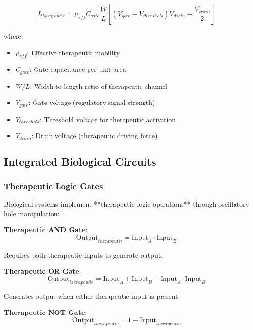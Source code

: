 \documentclass[12pt,a4paper]{article}
\begin{document}
\begin{equation}
I_{therapeutic} = \mu_{eff} C_{gate} \frac{W}{L} \left[(V_{gate} - V_{threshold})V_{drain} - \frac{V_{drain}^2}{2}\right]
\end{equation}

where:
\begin{itemize}
\item $\mu_{eff}$: Effective therapeutic mobility
\item $C_{gate}$: Gate capacitance per unit area
\item $W/L$: Width-to-length ratio of therapeutic channel
\item $V_{gate}$: Gate voltage (regulatory signal strength)
\item $V_{threshold}$: Threshold voltage for therapeutic activation
\item $V_{drain}$: Drain voltage (therapeutic driving force)
\end{itemize}

\subsection{Integrated Biological Circuits}

\subsubsection{Therapeutic Logic Gates}

Biological systems implement **therapeutic logic operations** through oscillatory hole manipulation:

\textbf{Therapeutic AND Gate}:
\begin{equation}
\text{Output}_{therapeutic} = \text{Input}_A \cdot \text{Input}_B
\end{equation}

Requires both therapeutic inputs to generate output.

\textbf{Therapeutic OR Gate}:
\begin{equation}
\text{Output}_{therapeutic} = \text{Input}_A + \text{Input}_B - \text{Input}_A \cdot \text{Input}_B
\end{equation}

Generates output when either therapeutic input is present.

\textbf{Therapeutic NOT Gate}:
\begin{equation}
\text{Output}_{therapeutic} = 1 - \text{Input}_{therapeutic}
\end{equation}
\end{document}
